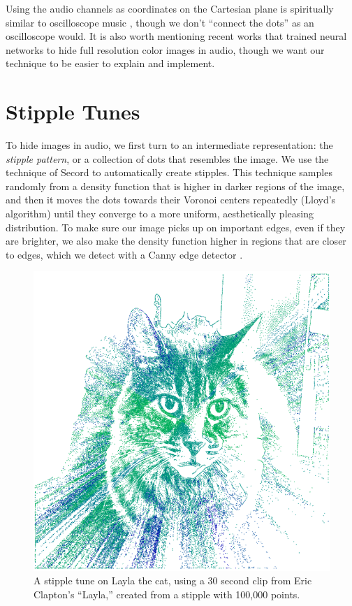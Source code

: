 \documentclass{article}
\begin{document}
Using the audio channels as coordinates on the Cartesian plane is spiritually similar to oscilloscope music \cite{felix2021_RenderingShapes, Charles2013, teschler2021}, though we don't ``connect the dots'' as an oscilloscope would.  It is also worth mentioning recent works that trained neural networks to hide full resolution color images \cite{cui_multi-stage_2021, geleta_pixinwav_2021, takahashi_source_2022, domenech2022hiding} in audio, though we want our technique to be easier to explain and implement.

\section{Stipple Tunes}

To hide images in audio, we first turn to an intermediate representation: the {\em stipple pattern}, or a collection of dots that resembles the image.  We use the technique of Secord \cite{secord2002weighted} to automatically create stipples.  This technique samples randomly from a density function that is higher in darker regions of the image, and then it moves the dots towards their Voronoi centers repeatedly (Lloyd's algorithm) until they converge to a more uniform, aesthetically pleasing distribution.  To make sure our image picks up on important edges, even if they are brighter, we also make the density function higher in regions that are closer to edges, which we detect with a Canny edge detector \cite{canny1986computational}.

\begin{figure}
  \centering
  \includegraphics[width=0.8\columnwidth]{laylaViterbiStipple.png}
  \caption{A stipple tune on Layla the cat, using a 30 second clip from Eric Clapton's ``Layla,'' created from a stipple with 100,000 points.}
  \label{fig:laylaViterbiStipple}
\end{figure}
\end{document}
